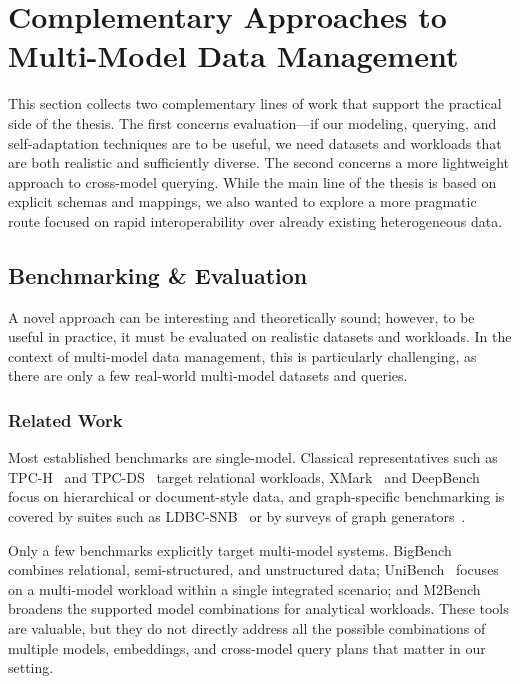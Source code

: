 \section{Complementary Approaches to Multi-Model Data Management}
\label{sec:related-concepts}

This section collects two complementary lines of work that support the practical side of the thesis. The first concerns evaluation---if our modeling, querying, and self-adaptation techniques are to be useful, we need datasets and workloads that are both realistic and sufficiently diverse. The second concerns a more lightweight approach to cross-model querying. While the main line of the thesis is based on explicit schemas and mappings, we also wanted to explore a more pragmatic route focused on rapid interoperability over already existing heterogeneous data.

\subsection{Benchmarking \& Evaluation}

A novel approach can be interesting and theoretically sound; however, to be useful in practice, it must be evaluated on realistic datasets and workloads. In the context of multi-model data management, this is particularly challenging, as there are only a few real-world multi-model datasets and queries.

\subsubsection{Related Work}

Most established benchmarks are single-model. Classical representatives such as TPC-H~\citep{tpch} and TPC-DS~\citep{tpcds} target relational workloads, XMark~\citep{10.5555/1287369.1287455} and DeepBench~\citep{10.1145/3531348.3532176} focus on hierarchical or document-style data, and graph-specific benchmarking is covered by suites such as LDBC-SNB~\citep{10.1145/2723372.2742786} or by surveys of graph generators~\citep{10.1145/3379445}.

Only a few benchmarks explicitly target multi-model systems. BigBench~\citep{10.1145/2463676.2463712} combines relational, semi-structured, and unstructured data; UniBench~\citep{unibench} focuses on a multi-model workload within a single integrated scenario; and M2Bench~\citep{10.14778/3574245.3574259} broadens the supported model combinations for analytical workloads. These tools are valuable, but they do not directly address all the possible combinations of multiple models, embeddings, and cross-model query plans that matter in our setting.


